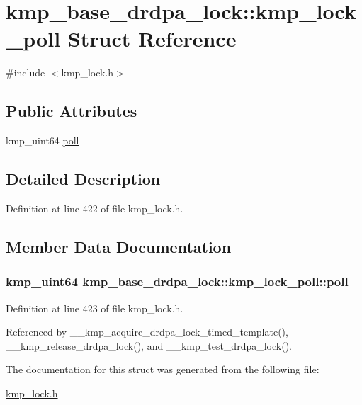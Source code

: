 \hypertarget{structkmp__base__drdpa__lock_1_1kmp__lock__poll}{\section{kmp\-\_\-base\-\_\-drdpa\-\_\-lock\-:\-:kmp\-\_\-lock\-\_\-poll Struct Reference}
\label{structkmp__base__drdpa__lock_1_1kmp__lock__poll}
}


{\ttfamily \#include $<$kmp\-\_\-lock.\-h$>$}

\subsection*{Public Attributes}
\begin{DoxyCompactItemize}
\item 
kmp\-\_\-uint64 \hyperlink{structkmp__base__drdpa__lock_1_1kmp__lock__poll_a8e501c759a67b04ad7e967131b035859}{poll}
\end{DoxyCompactItemize}


\subsection{Detailed Description}


Definition at line 422 of file kmp\-\_\-lock.\-h.



\subsection{Member Data Documentation}
\hypertarget{structkmp__base__drdpa__lock_1_1kmp__lock__poll_a8e501c759a67b04ad7e967131b035859}{
\subsubsection[{poll}]{\setlength{\rightskip}{0pt plus 5cm}kmp\-\_\-uint64 kmp\-\_\-base\-\_\-drdpa\-\_\-lock\-::kmp\-\_\-lock\-\_\-poll\-::poll}}\label{structkmp__base__drdpa__lock_1_1kmp__lock__poll_a8e501c759a67b04ad7e967131b035859}


Definition at line 423 of file kmp\-\_\-lock.\-h.



Referenced by \-\_\-\-\_\-kmp\-\_\-acquire\-\_\-drdpa\-\_\-lock\-\_\-timed\-\_\-template(), \-\_\-\-\_\-kmp\-\_\-release\-\_\-drdpa\-\_\-lock(), and \-\_\-\-\_\-kmp\-\_\-test\-\_\-drdpa\-\_\-lock().



The documentation for this struct was generated from the following file\-:\begin{DoxyCompactItemize}
\item 
\hyperlink{kmp__lock_8h}{kmp\-\_\-lock.\-h}\end{DoxyCompactItemize}
